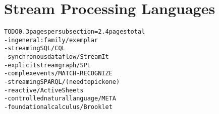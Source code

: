 \section{Stream Processing Languages}\label{sec:languages}

\begin{alltt}TODO\scriptsize 0.3 pages per subsection = 2.4 pages total
- in general: family / exemplar
- streaming SQL / CQL \cite{arasu_babu_widom_2006}
- synchronous dataflow / StreamIt \cite{thies_et_al_2002}
- explicit stream graph / SPL \cite{hirzel_et_al_2013}
- complex events / MATCH-RECOGNIZE \cite{zemke_et_al_2007}
- streaming SPARQL / (need to pick one)
- reactive / ActiveSheets \cite{vaziri_et_al_2014}
- controlled natural language / META \cite{arnold_et_al_2016}
- foundational calculus / Brooklet \cite{soule_et_al_2010}
\end{alltt}
